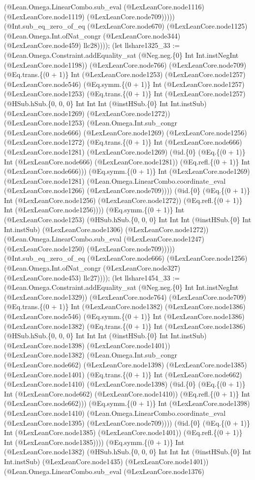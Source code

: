 \documentclass[11pt]{article}
\begin{document}
(@Lean.Omega.LinearCombo.sub\_eval (@LexLeanCore.node1116) (@LexLeanCore.node1119) (@LexLeanCore.node709))))) (@Int.sub\_eq\_zero\_of\_eq (@LexLeanCore.node670) (@LexLeanCore.node1125) (@Lean.Omega.Int.ofNat\_congr (@LexLeanCore.node344) (@LexLeanCore.node459) llc28)))); (let llshare1325\_33 := (@Lean.Omega.Constraint.addEquality\_sat (@Neg.neg.\{0\} Int Int.instNegInt (@LexLeanCore.node1198)) (@LexLeanCore.node766) (@LexLeanCore.node709) (@Eq.trans.\{(0 + 1)\} Int (@LexLeanCore.node1253) (@LexLeanCore.node1257) (@LexLeanCore.node546) (@Eq.symm.\{(0 + 1)\} Int (@LexLeanCore.node1257) (@LexLeanCore.node1253) (@Eq.trans.\{(0 + 1)\} Int (@LexLeanCore.node1257) (@HSub.hSub.\{0, 0, 0\} Int Int Int (@instHSub.\{0\} Int Int.instSub) (@LexLeanCore.node1269) (@LexLeanCore.node1272)) (@LexLeanCore.node1253) (@Lean.Omega.Int.sub\_congr (@LexLeanCore.node666) (@LexLeanCore.node1269) (@LexLeanCore.node1256) (@LexLeanCore.node1272) (@Eq.trans.\{(0 + 1)\} Int (@LexLeanCore.node666) (@LexLeanCore.node1281) (@LexLeanCore.node1269) (@id.\{0\} (@Eq.\{(0 + 1)\} Int (@LexLeanCore.node666) (@LexLeanCore.node1281)) (@Eq.refl.\{(0 + 1)\} Int (@LexLeanCore.node666))) (@Eq.symm.\{(0 + 1)\} Int (@LexLeanCore.node1269) (@LexLeanCore.node1281) (@Lean.Omega.LinearCombo.coordinate\_eval (@LexLeanCore.node1266) (@LexLeanCore.node709)))) (@id.\{0\} (@Eq.\{(0 + 1)\} Int (@LexLeanCore.node1256) (@LexLeanCore.node1272)) (@Eq.refl.\{(0 + 1)\} Int (@LexLeanCore.node1256)))) (@Eq.symm.\{(0 + 1)\} Int (@LexLeanCore.node1253) (@HSub.hSub.\{0, 0, 0\} Int Int Int (@instHSub.\{0\} Int Int.instSub) (@LexLeanCore.node1306) (@LexLeanCore.node1272)) (@Lean.Omega.LinearCombo.sub\_eval (@LexLeanCore.node1247) (@LexLeanCore.node1250) (@LexLeanCore.node709))))) (@Int.sub\_eq\_zero\_of\_eq (@LexLeanCore.node666) (@LexLeanCore.node1256) (@Lean.Omega.Int.ofNat\_congr (@LexLeanCore.node327) (@LexLeanCore.node453) llc27)))); (let llshare1454\_33 := (@Lean.Omega.Constraint.addEquality\_sat (@Neg.neg.\{0\} Int Int.instNegInt (@LexLeanCore.node1329)) (@LexLeanCore.node764) (@LexLeanCore.node709) (@Eq.trans.\{(0 + 1)\} Int (@LexLeanCore.node1382) (@LexLeanCore.node1386) (@LexLeanCore.node546) (@Eq.symm.\{(0 + 1)\} Int (@LexLeanCore.node1386) (@LexLeanCore.node1382) (@Eq.trans.\{(0 + 1)\} Int (@LexLeanCore.node1386) (@HSub.hSub.\{0, 0, 0\} Int Int Int (@instHSub.\{0\} Int Int.instSub) (@LexLeanCore.node1398) (@LexLeanCore.node1401)) (@LexLeanCore.node1382) (@Lean.Omega.Int.sub\_congr (@LexLeanCore.node662) (@LexLeanCore.node1398) (@LexLeanCore.node1385) (@LexLeanCore.node1401) (@Eq.trans.\{(0 + 1)\} Int (@LexLeanCore.node662) (@LexLeanCore.node1410) (@LexLeanCore.node1398) (@id.\{0\} (@Eq.\{(0 + 1)\} Int (@LexLeanCore.node662) (@LexLeanCore.node1410)) (@Eq.refl.\{(0 + 1)\} Int (@LexLeanCore.node662))) (@Eq.symm.\{(0 + 1)\} Int (@LexLeanCore.node1398) (@LexLeanCore.node1410) (@Lean.Omega.LinearCombo.coordinate\_eval (@LexLeanCore.node1395) (@LexLeanCore.node709)))) (@id.\{0\} (@Eq.\{(0 + 1)\} Int (@LexLeanCore.node1385) (@LexLeanCore.node1401)) (@Eq.refl.\{(0 + 1)\} Int (@LexLeanCore.node1385)))) (@Eq.symm.\{(0 + 1)\} Int (@LexLeanCore.node1382) (@HSub.hSub.\{0, 0, 0\} Int Int Int (@instHSub.\{0\} Int Int.instSub) (@LexLeanCore.node1435) (@LexLeanCore.node1401)) (@Lean.Omega.LinearCombo.sub\_eval (@LexLeanCore.node1376) 
\end{document}
